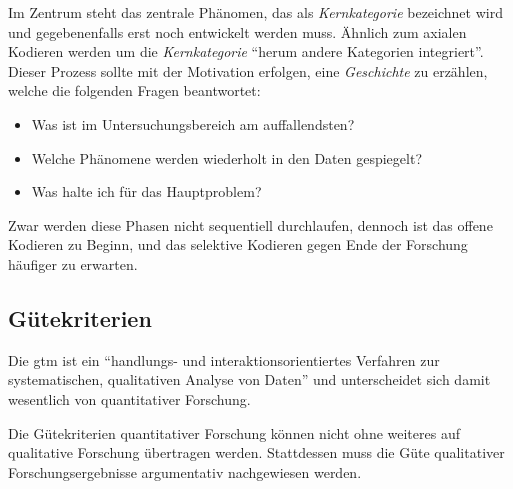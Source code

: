 \begin{description}
  Im Zentrum steht das zentrale Phänomen, das als \textit{Kernkategorie} bezeichnet wird und gegebenenfalls erst noch entwickelt werden muss. Ähnlich zum axialen Kodieren werden um die \textit{Kernkategorie} ``herum andere Kategorien integriert''. Dieser Prozess sollte mit der Motivation erfolgen, eine \textit{Geschichte} zu erzählen, welche die folgenden Fragen beantwortet:
  
  \begin{itemize}
    \item Was ist im Untersuchungsbereich am auffallendsten?
    \item Welche Phänomene werden wiederholt in den Daten gespiegelt?
    \item Was halte ich für das Hauptproblem?
  \end{itemize}
\end{description}

Zwar werden diese Phasen nicht sequentiell durchlaufen, dennoch ist das offene Kodieren zu Beginn, und das selektive Kodieren gegen Ende der Forschung häufiger zu erwarten.



\subsection{Gütekriterien}

Die \gls{gtm} ist ein ``handlungs- und interaktionsorientiertes Verfahren zur systematischen, qualitativen Analyse von Daten'' \citep{Salinger:2013vd} und unterscheidet sich damit wesentlich von quantitativer Forschung.

Die Gütekriterien quantitativer Forschung können nicht ohne weiteres auf qualitative Forschung übertragen werden. Stattdessen muss die Güte qualitativer Forschungsergebnisse argumentativ nachgewiesen werden. \citep{mayring2002einfhrung}

